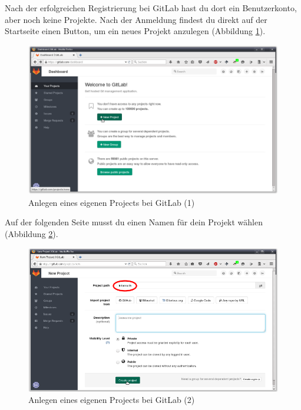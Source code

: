 Nach der erfolgreichen Registrierung bei GitLab hast du dort ein Benutzerkonto,
aber noch keine Projekte. Nach der Anmeldung findest du direkt auf der
Startseite einen Button, um ein neues Projekt anzulegen (Abbildung
\ref{fig:gitlab-new-project-1}).

\begin{figure}[h]
  \centering
   \includegraphics[width=1.0\textwidth]{./inf/SEKII/01_Vorbereitung/GitLab_New_Project_1.png}
   \caption{Anlegen eines eigenen Projects bei GitLab (1)}
   \label{fig:gitlab-new-project-1}
\end{figure}

Auf der folgenden Seite musst du einen Namen für dein Projekt wählen (Abbildung
\ref{fig:gitlab-new-project-2}).

\begin{figure}[h]
  \centering
   \includegraphics[width=1.0\textwidth]{./inf/SEKII/01_Vorbereitung/GitLab_New_Project_2.png}
   \caption{Anlegen eines eigenen Projects bei GitLab (2)}
   \label{fig:gitlab-new-project-2}
\end{figure}

